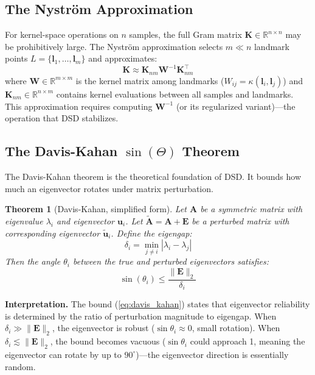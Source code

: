 \documentclass[preprint,review,12pt]{elsarticle}
\newtheorem{theorem}{Theorem}
\begin{document}
\subsection{The Nystr\"{o}m Approximation}

For kernel-space operations on $n$ samples, the full Gram matrix $\bm{K} \in \mathbb{R}^{n \times n}$ may be prohibitively large. The Nystr\"{o}m approximation \cite{williams2001nystrom} selects $m \ll n$ landmark points $L = \{\bm{l}_1, \ldots, \bm{l}_m\}$ and approximates:
\begin{equation}
\bm{K} \approx \bm{K}_{nm} \bm{W}^{-1} \bm{K}_{nm}^\top
\label{eq:nystrom}
\end{equation}
where $\bm{W} \in \mathbb{R}^{m \times m}$ is the kernel matrix among landmarks ($W_{ij} = \kappa(\bm{l}_i, \bm{l}_j)$) and $\bm{K}_{nm} \in \mathbb{R}^{n \times m}$ contains kernel evaluations between all samples and landmarks. This approximation requires computing $\bm{W}^{-1}$ (or its regularized variant)---the operation that DSD stabilizes.

\subsection{The Davis-Kahan $\sin(\Theta)$ Theorem}
\label{sec:davis_kahan}

The Davis-Kahan theorem \cite{davis1970rotation} is the theoretical foundation of DSD. It bounds how much an eigenvector rotates under matrix perturbation.

\begin{theorem}[Davis-Kahan, simplified form]
Let $\bm{A}$ be a symmetric matrix with eigenvalue $\lambda_i$ and eigenvector $\bm{u}_i$. Let $\tilde{\bm{A}} = \bm{A} + \bm{E}$ be a perturbed matrix with corresponding eigenvector $\tilde{\bm{u}}_i$. Define the eigengap:
\begin{equation}
\delta_i = \min_{j \neq i} |\lambda_i - \lambda_j|
\end{equation}
Then the angle $\theta_i$ between the true and perturbed eigenvectors satisfies:
\begin{equation}
\sin(\theta_i) \leq \frac{\|\bm{E}\|_2}{\delta_i}
\label{eq:davis_kahan}
\end{equation}
\end{theorem}

\textbf{Interpretation.} The bound (\ref{eq:davis_kahan}) states that eigenvector reliability is determined by the ratio of perturbation magnitude to eigengap. When $\delta_i \gg \|\bm{E}\|_2$, the eigenvector is robust ($\sin\theta_i \approx 0$, small rotation). When $\delta_i \lesssim \|\bm{E}\|_2$, the bound becomes vacuous ($\sin\theta_i$ could approach 1, meaning the eigenvector can rotate by up to $90^\circ$)---the eigenvector direction is essentially random.
\end{document}
